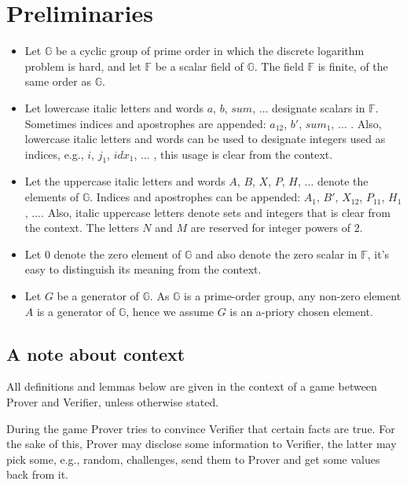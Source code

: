 \documentclass{mathcryptology} %
\theoremstyle{title}
\theoremstyle{titleof}
\begin{document}
\section{Preliminaries}
    \begin{itemize}
        \item Let $\mathds{G}$ be a cyclic group of prime order in which the discrete logarithm problem is hard, and let $\mathds{F}$ be a scalar field of $\mathds{G}$. The field $\mathds{F}$ is finite, of the same order as $\mathds{G}$.
        \item Let lowercase italic letters and words $a$, $b$, ${sum}$, $\dots$ designate scalars in $\mathds{F}$. Sometimes indices and apostrophes are appended: $a_{12}$, $b'$, ${sum}_{1}$, $\dots$ . Also, lowercase italic letters and words can be used to designate integers used as indices, e.g., $i$, $j_{1}$, ${idx}_{1}$, ${\dots}$ , this usage is clear from the context.
        \item Let the uppercase italic letters and words $A$, $B$, $X$, $P$, $H$, ${\dots}$ denote the elements of $\mathds{G}$. Indices and apostrophes can be appended: $A_{1}$, $B'$, $X_{12}$, $P_{11}$, $H_{1}$, ${\dots}$. Also, italic uppercase letters denote sets and integers that is clear from the context. The letters $N$ and $M$ are reserved for integer powers of $2$.
        \item Let $0$ denote the zero element of $\mathds{G}$ and also denote the zero scalar in $\mathds{F}$, it's easy to distinguish its meaning from the context.
        \item Let $G$ be a generator of $\mathds{G}$. As $\mathds{G}$ is a prime-order group, any non-zero element $A$ is a generator of $\mathds{G}$, hence we assume $G$ is an a-priory chosen element.
    \end{itemize}


\subsection{A note about context}
    All definitions and lemmas below are given in the context of a game between Prover and Verifier, unless otherwise stated.

    During the game Prover tries to convince Verifier that certain facts are true. For the sake of this, Prover may disclose some information to Verifier, the latter may pick some, e.g., random, challenges, send them to Prover and get some values back from it.
\end{document}
